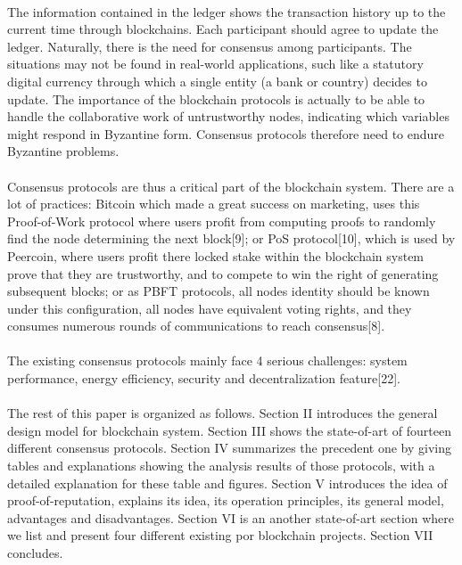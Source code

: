 \documentclass[doublespacing]{bmcart}
\begin{document}
\begin{CJK*}{UTF8}{gbsn}
	\paragraph{}
	The information contained in the ledger shows the transaction history up to the current time through blockchains. Each participant should agree to update the ledger. Naturally, there is the need for consensus among participants. The situations may not be found in  real-world applications, such like a statutory digital currency through which a single entity (a bank or country) decides to update. The importance of the blockchain protocols is actually to be able to handle the collaborative work of untrustworthy nodes, indicating which variables might respond in Byzantine form. Consensus protocols therefore need to endure Byzantine problems.
\paragraph{}
	Consensus protocols are thus a critical part of the blockchain system. There are a lot of practices: Bitcoin which made a great success on marketing, uses this Proof-of-Work protocol where users profit from computing proofs to randomly find the node determining the next block[9]; or PoS protocol[10], which is used by Peercoin, where users profit there locked stake within the blockchain system prove that they are trustworthy, and to compete to win the right of generating subsequent blocks; or as PBFT protocols, all nodes identity should be known under this configuration, all nodes have equivalent voting rights, and they consumes numerous rounds of communications to reach consensus[8].
	\paragraph{} 
	The existing consensus protocols mainly face 4 serious challenges: system performance, energy efficiency, security and decentralization feature[22].
\paragraph{} The rest of this paper is organized as follows. Section II introduces the general design model for blockchain system. Section III shows the state-of-art of fourteen different consensus protocols. Section IV summarizes the precedent one by giving tables and explanations showing the analysis results of those protocols, with a detailed explanation for these table and figures. Section V introduces the idea of proof-of-reputation, explains its idea, its operation principles, its general model, advantages and disadvantages. Section VI is an another state-of-art section where we list and present four different existing por blockchain projects. %
 Section VII concludes.

\end{CJK*}
\end{document}
